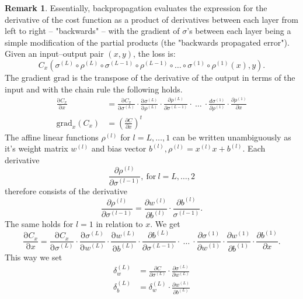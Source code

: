 \documentclass{article}
\theoremstyle{definition}
\newtheorem{remark}[theorem]{Remark}
\begin{document}
\begin{remark}
\label{com:back_prop_madness}
Essentially, backpropagation evaluates the expression for the derivative of the cost function as a product of derivatives between each layer from left to right – "backwards" – with the gradient of $\sigma$'s between each layer being a simple modification of the partial products (the "backwards propagated error").
Given an input–output pair $(x,y)$, the loss is:
$$C_{x}(\sigma^{(L)} \circ \rho^{(L)} \circ \sigma^{(L-1)} \circ \rho^{(L-1)} \circ \dots \circ \sigma^{(1)} \circ \rho^{(1)}(x), y).$$
The gradient $\text{grad}$ is the transpose of the derivative of the output in terms of the input and with the chain rule the following holds.
\begin{align*}
\frac{\mathrm \partial C_{x}}{\mathrm \partial x} &= \frac{\mathrm \partial C_{x}}{\mathrm \partial \sigma^{(L)}} \cdot \frac{\mathrm \partial \sigma^{(L)}}{\mathrm \partial \rho^{(L)}} \cdot \frac{\partial \rho^{(L)}}{\partial \sigma^{(L-1)}} \cdot \ \ldots \ \cdot \frac{d \sigma^{(1)}}{\partial \rho^{(1)}} \cdot \frac{\partial \rho^{(1)}}{\partial x}\\
\text{grad}_{x} (C_{x}) &= \left(\frac{\partial C}{\partial x}\right)^{t}
\end{align*}
The affine linear functions $\rho^{(l)}$ for $l=L, \dots , 1$ can be written unambiguously as it's weight matrix $w^{(l)}$ and bias vector $b^{(l)}, \rho^{(l)} = x^{(l)} x + b^{(l)}$. Each derivative 
$$\frac{\partial \rho^{(l)}}{\partial \sigma^{(l-1)}}, \ \text{for} \ l=L, \dots, 2$$ therefore consists of the derivative 
$$\frac{\partial \rho^{(l)}}{\partial \sigma^{(l-1)}} = \frac{\partial w^{(l)}}{\partial b^{(l)}} \cdot \frac{\partial b^{(l)}}{\sigma^{(l-1)}}.$$ 
The same holds for $l = 1$ in relation to $x$. We get
$$\frac{\mathrm \partial C_{x}}{\mathrm \partial x} = \frac{\mathrm \partial C_{x}}{\mathrm \partial \sigma^{(L)}} \cdot \frac{\mathrm \partial \sigma^{(L)}}{\mathrm \partial w^{(L)}} \cdot \frac{\mathrm \partial w^{(L)}}{\mathrm \partial b^{(L)}} \cdot \frac{\partial b^{(L)}}{\partial \sigma^{(L-1)}} \cdot \ \ldots \ \cdot \frac{\partial \sigma^{(1)}}{\partial w^{(1)}} \cdot \frac{\partial w^{(1)}}{\partial b^{(1)}} \cdot \frac{\partial b^{(1)}}{\partial x}.$$
This way we set
\begin{align*}
\delta^{(L)}_{w} &= \frac{\partial C}{\partial \sigma^{(L)}} \cdot \frac{\partial \sigma^{(L)}}{\partial w^{(L)}} \\
\delta^{(L)}_{b} &= \delta^{(L)}_{w} \cdot \frac{\partial w^{(L)}}{\partial b^{(L)}} \\

\end{align*}
\end{remark}
\end{document}
